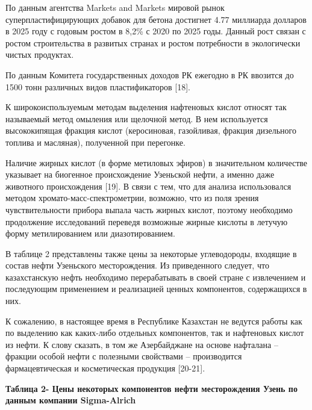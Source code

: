 По данным агентства Markets and Markets мировой рынок
суперпластифицирующих добавок для бетона достигнет 4.77 миллиарда
долларов в 2025 году с годовым ростом в 8,2\% с 2020 по 2025 годы.
Данный рост связан с ростом строительства в развитых странах и ростом
потребности в экологически чистых продуктах.

По данным Комитета государственных доходов РК ежегодно в РК ввозится до
1500 тонн различных видов пластификаторов {[}18{]}.

К широкоиспользуемым методам выделения нафтеновых кислот относят так
называемый метод омыления или щелочной метод. В нем используется
высококипящая фракция кислот (керосиновая, газойливая, фракция
дизельного топлива и масляная), полученной при перегонке.

Наличие жирных кислот (в форме метиловых эфиров) в значительном
количестве указывает на биогенное происхождение Узеньской нефти, а
именно даже животного происхождения {[}19{]}. В связи с тем, что для
анализа использовался методом хромато-масс-спектрометрии, возможно, что
из поля зрения чувствительности прибора выпала часть жирных кислот,
поэтому необходимо продолжение исследований переведя возможные жирные
кислоты в летучую форму метилированием или диазотированием.

В таблице 2 представлены также цены за некоторые углеводороды, входящие
в состав нефти Узеньского месторождения. Из приведенного следует, что
казахстанскую нефть необходимо перерабатывать в своей стране с
извлечением и последующим применением и реализацией ценных компонентов,
содержащихся в них.

К сожалению, в настоящее время в Республике Казахстан не ведутся работы
как по выделению как каких-либо отдельных компонентов, так и нафтеновых
кислот из нефти. К слову сказать, в том же Азербайджане на основе
нафталана -- фракции особой нефти с полезными свойствами -- производится
фармацевтическая и косметическая продукция {[}20-21{]}.

{\bfseries Таблица 2- Цены некоторых компонентов нефти месторождения Узень
по данным компании Sigma-Alrich}


